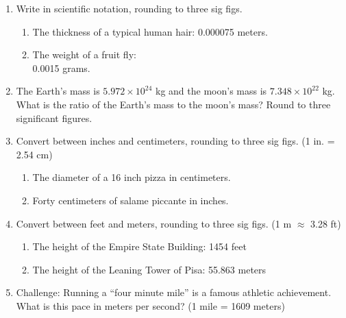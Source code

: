 \documentclass[12pt, twoside]{article}
\begin{document}
\begin{enumerate}[itemsep=0.5cm]
\item Write in scientific notation, rounding to three sig figs.
  \begin{multicols}{2}
    \begin{enumerate}[itemsep=1cm]
      \item The thickness of a typical human hair: 0.000075 meters.
      \item The weight of a fruit fly: \\ 0.0015 grams.
    \end{enumerate}
  \end{multicols} \vspace{2cm}

\newpage
\item The Earth's mass is $5.972 \times 10^{24}$ kg and the moon's mass is $7.348 \times 10^{22}$ kg. What is the ratio of the Earth's mass to the moon's mass? Round to three significant figures. \vspace{2cm}
  
\item Convert between inches and centimeters, rounding to three sig figs. (1 in. = 2.54 cm)
  \begin{enumerate}[itemsep=2cm]
    \item The diameter of a 16 inch pizza in centimeters.
    \item Forty centimeters of salame piccante in inches.
  \end{enumerate} \vspace{2cm}
      
\item Convert between feet and meters, rounding to three sig figs. (1 m $\approx$ 3.28 ft)
  \begin{enumerate}[itemsep=2cm]
    \item The height of the Empire State Building: 1454 feet
    \item The height of the Leaning Tower of Pisa: 55.863 meters
  \end{enumerate} \vspace{2cm}

\item Challenge: Running a ``four minute mile'' is a famous athletic achievement. What is this pace in meters per second? (1 mile = 1609 meters)
  
\end{enumerate}
\end{document}

